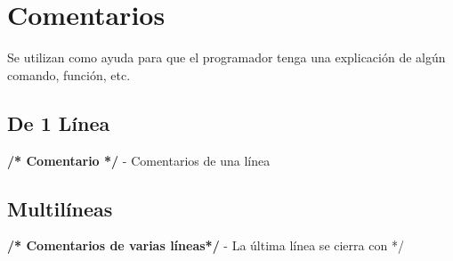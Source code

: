 \chapter[Comentarios]{Comentarios}
\raggedright
Se utilizan como ayuda para que el programador tenga una explicación de algún comando, función, etc.

\section [De 1 línea]{De 1 Línea}
	\textbf{/* Comentario */} - Comentarios de una línea 

\section [Multilíneas]{Multilíneas}
	\textbf{/* Comentarios de varias líneas*/}  - La última línea se cierra con */



